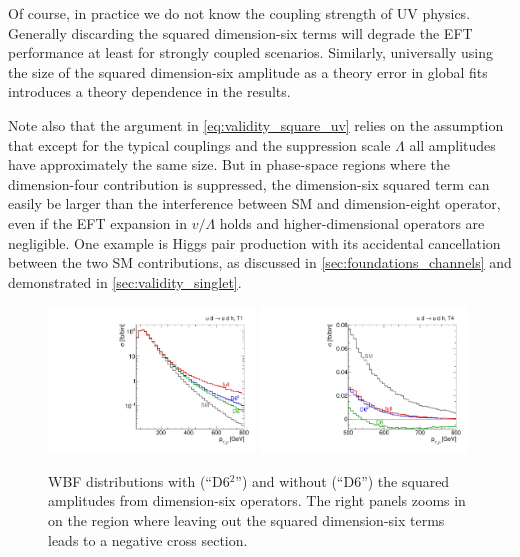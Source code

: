 Of course, in practice we do not know the coupling strength of UV
physics. Generally discarding the squared dimension-six terms will
degrade the EFT performance at least for strongly coupled
scenarios. Similarly, universally using the size of the squared
dimension-six amplitude as a theory error in global fits introduces a
theory dependence in the results.

Note also that the argument in \autoref{eq:validity_square_uv} relies
on the assumption that except for the typical couplings and the
suppression scale $\Lambda$ all amplitudes have approximately the same
size. But in phase-space regions where the dimension-four contribution
is suppressed, the dimension-six squared term can easily be larger
than the interference between SM and dimension-eight operator, even if
the EFT expansion in $v/\Lambda$ holds and higher-dimensional
operators are negligible. One example is Higgs pair production with
its accidental cancellation between the two SM contributions, as
discussed in \autoref{sec:foundations_channels} and demonstrated in
\ref{sec:validity_singlet}.

\begin{figure}
  \includegraphics[width=0.49\textwidth]{fig/validity/WBF_T1_j1pt.pdf}%
  \includegraphics[width=0.49\textwidth]{fig/validity/WBF_T4_j1pt_zoom.pdf}%
  \caption{WBF distributions with (``D6$^{2}$'') and without (``D6'')
    the squared amplitudes from dimension-six operators. The right
    panels zooms in on the region where leaving out the squared
    dimension-six terms leads to a negative cross section.}
  \label{fig:validity_squared}
\end{figure}

